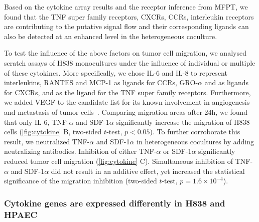Based on the cytokine array results and the receptor inference from MFPT, 
we found that the TNF super family receptors, CXCRs, CCRs,
interleukin receptors are contributing to the putative 
signal flow and their corresponding ligands can also be
detected at an enhanced level in the heterogeneous coculture.

To test the influence of the above factors on tumor cell migration,
we analysed scratch assays of H838 monocultures under the influence of 
individual or multiple of these cytokines. 
More specifically, we chose IL-6 and IL-8 to represent 
interleukins, RANTES and MCP-1 as ligands for CCRs, 
GRO-$\alpha$ and \sdfonea as ligands for CXCRs, and \tnfa
as the ligand for the TNF super family receptors.
Furthermore, we added VEGF to the candidate list for its known involvement in
angiogenesis and metastasis of tumor cells~\citep{Ferrara2003,Hiratsuka2002}. 
Comparing migration areas after 24h, 
we found that only IL-6, TNF-$\alpha$ and SDF-1$\alpha$ significantly 
increase the migration of H838 cells (\ref{fig:cytokine} B, two-sided $t$-test,
$p < 0.05$). 
To further corroborate this result, we neutralized 
TNF-$\alpha$ and SDF-1$\alpha$ in heterogeneous cocultures  by adding neutralizing antibodies.
Inhibition of  either TNF-$\alpha$ or SDF-1$\alpha$ significantly reduced tumor cell migration (\ref{fig:cytokine} C). 
Simultaneous inhibition of TNF-$\alpha$ and SDF-1$\alpha$ did not result in an additive effect, yet increased the statistical significance of the migration 
inhibition
(two-sided $t$-test, $p=1.6\times10^{-4}$).

\subsubsection{Cytokine genes are expressed differently in H838 and HPAEC}

